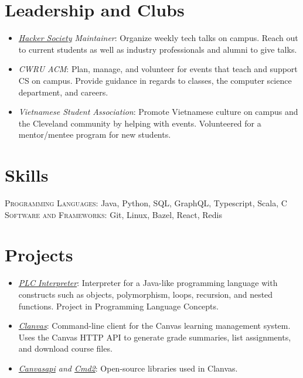 \documentclass[a4paper,11pt]{article}
\begin{document}
\section{Leadership and Clubs}
\begin{itemize}[noitemsep]
	\item \emph{\href{http://hacsoc.org}{Hacker Society} Maintainer}: Organize weekly tech talks on campus. Reach out to current students as well as industry professionals and alumni to give talks.
	\item \emph{CWRU ACM}: Plan, manage, and volunteer for events that teach and support CS on campus. Provide guidance in regards to classes, the computer science department, and careers.
	\item \emph{Vietnamese Student Association}: Promote Vietnamese culture on campus and the Cleveland community by helping with events. Volunteered for a mentor/mentee program for new students.
\end{itemize}
\section{Skills}
\textsc{Programming Languages}: Java, Python, SQL, GraphQL, Typescript, Scala, C \\
\textsc{Software and Frameworks}: Git, Linux, Bazel, React, Redis
\section{Projects}
\begin{itemize}
    \item \emph{\href{https://github.com/marklalor/PLCInterpreter}{PLC Interpreter}}: Interpreter for a Java-like programming language with constructs such as objects, polymorphism, loops, recursion, and nested functions. Project in Programming Language Concepts.
    \item \emph{\href{https://github.com/marklalor/clanvas}{Clanvas}}: Command-line client for the Canvas learning management system. Uses the Canvas HTTP API to generate grade summaries, list assignments, and download course files.
    \item \emph{\href{https://github.com/ucfopen/canvasapi}{Canvasapi} and \href{https://github.com/python-cmd2/cmd2}{Cmd2}}: Open-source libraries used in Clanvas.
\end{itemize}
\end{document}
